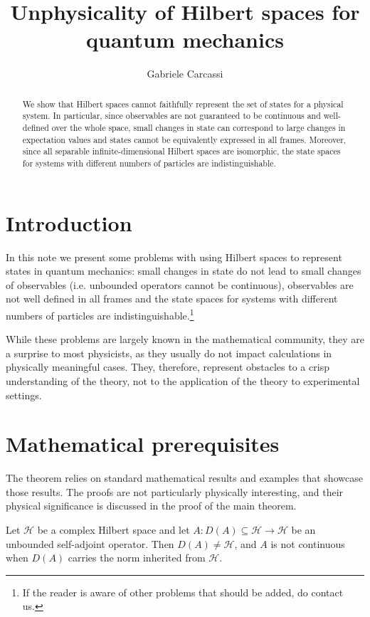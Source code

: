 \documentclass{techbrief}
\title{Unphysicality of Hilbert spaces for quantum mechanics}
\author{Gabriele Carcassi}
\begin{document}
	
\maketitle
	
\begin{abstract}
	We show that Hilbert spaces cannot faithfully represent the set of states for a physical system. In particular, since observables are not guaranteed to be continuous and well-defined over the whole space, small changes in state can correspond to large changes in expectation values and states cannot be equivalently expressed in all frames. Moreover, since all separable infinite-dimensional Hilbert spaces are isomorphic, the state spaces for systems with different numbers of particles are indistinguishable.
\end{abstract}

\section{Introduction}

In this note we present some problems with using Hilbert spaces to represent states in quantum mechanics: small changes in state do not lead to small changes of observables (i.e. unbounded operators cannot be continuous), observables are not well defined in all frames and the state spaces for systems with different numbers of particles are indistinguishable.\footnote{If the reader is aware of other problems that should be added, do contact us.}

While these problems are largely known in the mathematical community, they are a surprise to most physicists, as they usually do not impact calculations in physically meaningful cases. They, therefore, represent obstacles to a crisp understanding of the theory, not to the application of the theory to experimental settings.

\section{Mathematical prerequisites}

The theorem relies on standard mathematical results and examples that showcase those results. The proofs are not particularly physically interesting, and their physical significance is discussed in the proof of the main theorem.

\begin{prop}\label{unboundedDiscontinuous}
	Let $\mathcal{H}$ be a complex Hilbert space and let
	$A:D(A)\subseteq\mathcal{H}\to\mathcal{H}$ be an unbounded
	self-adjoint operator. Then $D(A)\neq\mathcal{H}$, and $A$ is
	not continuous when $D(A)$ carries the norm inherited from
	$\mathcal{H}$.
\end{prop}
\end{document}

